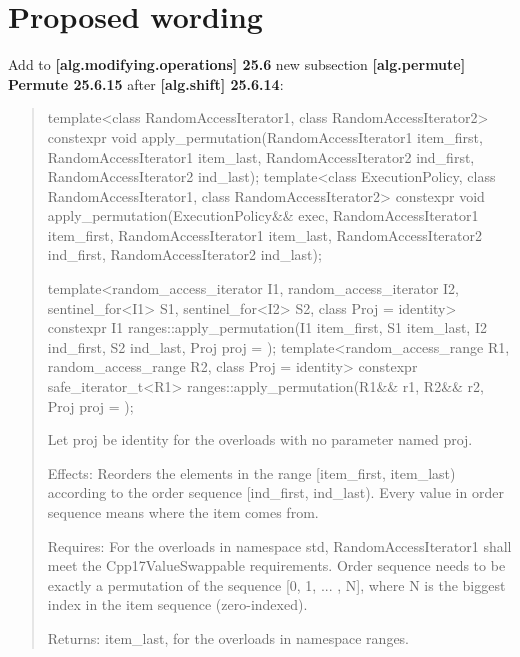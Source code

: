 \documentclass{wg21}
\begin{document}
\section{Proposed wording}
Add to \textbf{[alg.modifying.operations] 25.6} new subsection \textbf{[alg.permute] Permute 25.6.15}
after \textbf{[alg.shift] 25.6.14}:
\begin{quote}
\begin{itemdecl}
template<class RandomAccessIterator1, class RandomAccessIterator2>
  constexpr void apply_permutation(RandomAccessIterator1 item_first,
                                   RandomAccessIterator1 item_last,
                                   RandomAccessIterator2 ind_first,
                                   RandomAccessIterator2 ind_last);
template<class ExecutionPolicy, class RandomAccessIterator1, class RandomAccessIterator2>
  constexpr void apply_permutation(ExecutionPolicy&& exec,
                                   RandomAccessIterator1 item_first,
                                   RandomAccessIterator1 item_last,
                                   RandomAccessIterator2 ind_first,
                                   RandomAccessIterator2 ind_last);

template<random_access_iterator I1, random_access_iterator I2, sentinel_for<I1> S1,
         sentinel_for<I2> S2, class Proj = identity>
  constexpr I1 ranges::apply_permutation(I1 item_first, S1 item_last, I2 ind_first, S2 ind_last,
                                         Proj proj = {});
template<random_access_range R1, random_access_range R2, class Proj = identity>
  constexpr safe_iterator_t<R1> ranges::apply_permutation(R1&& r1, R2&& r2, Proj proj = {});                                         
\end{itemdecl}

    Let proj be identity{} for the overloads with no parameter named proj.

    Effects: Reorders the elements in the range [item_first, item_last) according to the order sequence [ind_first, ind_last). Every value in order sequence means where the item comes from.
    
    Requires: For the overloads in namespace std, RandomAccessIterator1 shall meet the Cpp17ValueSwappable requirements. Order sequence needs to be exactly a permutation of the sequence [0, 1, ... , N], where N is the biggest index in the item sequence (zero-indexed).

    Returns: item_last, for the overloads in namespace ranges.


\end{quote}
\end{document}
